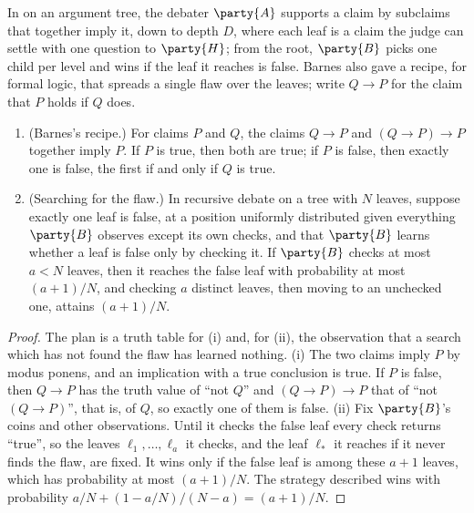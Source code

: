 \begin{refsection}
In  on an argument tree, the debater $\party{A}$ supports a claim by subclaims that together imply it, down to depth $D$, where each leaf is a claim the judge can settle with one question to $\party{H}$; from the root, $\party{B}$ picks one child per level and wins if the leaf it reaches is false. Barnes also gave a recipe, for formal logic, that spreads a single flaw over the leaves; write $Q\to P$ for the claim that $P$ holds if $Q$ does.

\begin{proposition}\label{prop:efficientdebate:needle}
\begin{enumerate}
\item (Barnes's recipe.) For claims $P$ and $Q$, the claims $Q\to P$ and $(Q\to P)\to P$ together imply $P$. If $P$ is true, then both are true; if $P$ is false, then exactly one is false, the first if and only if $Q$ is true.
\item (Searching for the flaw.) In recursive debate on a tree with $N$ leaves, suppose exactly one leaf is false, at a position uniformly distributed given everything $\party{B}$ observes except its own checks, and that $\party{B}$ learns whether a leaf is false only by checking it. If $\party{B}$ checks at most $a<N$ leaves, then it reaches the false leaf with probability at most $(a+1)/N$, and checking $a$ distinct leaves, then moving to an unchecked one, attains $(a+1)/N$.
\end{enumerate}
\end{proposition}

\begin{proof}
The plan is a truth table for (i) and, for (ii), the observation that a search which has not found the flaw has learned nothing. (i) The two claims imply $P$ by modus ponens, and an implication with a true conclusion is true. If $P$ is false, then $Q\to P$ has the truth value of ``not $Q$'' and $(Q\to P)\to P$ that of ``not $(Q\to P)$'', that is, of $Q$, so exactly one of them is false. (ii) Fix $\party{B}$'s coins and other observations. Until it checks the false leaf every check returns ``true'', so the leaves $\ell_1,\dots,\ell_a$ it checks, and the leaf $\ell_*$ it reaches if it never finds the flaw, are fixed. It wins only if the false leaf is among these $a+1$ leaves, which has probability at most $(a+1)/N$. The strategy described wins with probability $a/N+(1-a/N)/(N-a)=(a+1)/N$.
\end{proof}


\end{refsection}
